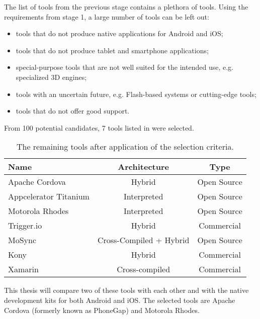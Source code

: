 The list of tools from the previous stage contains a plethora of tools. Using the requirements from stage 1, a large number of tools can be left out:

\begin{itemize}
    \item tools that do not produce native applications for Android and iOS;
    \item tools that do not produce tablet and smartphone applications;
    \item special-purpose tools that are not well suited for the intended use, e.g. specialized 3D engines;
    \item tools with an uncertain future, e.g. Flash-based systems or cutting-edge tools;
    \item tools that do not offer good support. 
\end{itemize}

From 100 potential candidates, 7 tools listed in  were selected.

\begin{table}[h!]
    \begin{center}
        \begin{tabular}{lcc}
            \hline
            Name & Architecture & Type \\
            \hline 
            Apache Cordova & Hybrid & Open Source \\
            Appcelerator Titanium & Interpreted & Open Source \\
            Motorola Rhodes & Interpreted & Open Source \\
            Trigger.io & Hybrid & Commercial \\
            MoSync & Cross-Compiled + Hybrid & Open Source \\
            Kony & Hybrid & Commercial \\
            Xamarin & Cross-compiled & Commercial \\
            \hline
        \end{tabular}
        \caption{The remaining tools after application of the selection criteria.}
        \label{table:tools}
    \end{center}
\end{table}

This thesis will compare two of these tools with each other and  with the native development kits for both Android and iOS. The selected tools are Apache Cordova (formerly known as PhoneGap) and Motorola Rhodes. 

